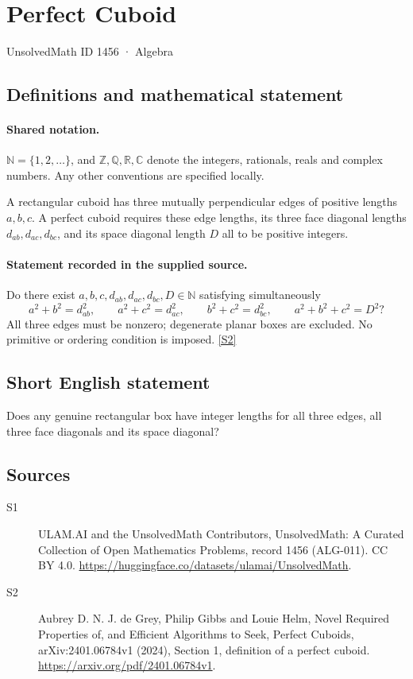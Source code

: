 \documentclass[11pt]{article}
\newcommand{\sref}[2]{\hyperlink{source:#1:#2}{[S#2]}}
\begin{document}
\setcounter{section}{1455}
\section{Perfect Cuboid}\label{1456}
{\small\sffamily UnsolvedMath ID 1456 · Algebra}
\subsection{Definitions and mathematical statement}

\paragraph{Shared notation.}$\mathbb N=\{1,2,\ldots\}$, and $\mathbb Z,\mathbb Q,\mathbb R,\mathbb C$ denote the integers, rationals, reals and complex numbers. Any other conventions are specified locally.


A rectangular cuboid has three mutually perpendicular edges of positive lengths $a,b,c$. A perfect cuboid requires these edge lengths, its three face diagonal lengths $d_{ab},d_{ac},d_{bc}$, and its space diagonal length $D$ all to be positive integers.
\paragraph{Statement recorded in the supplied source.}
Do there exist $a,b,c,d_{ab},d_{ac},d_{bc},D\in\mathbb N$ satisfying simultaneously
\[
 a^2+b^2=d_{ab}^2,\qquad a^2+c^2=d_{ac}^2,\qquad b^2+c^2=d_{bc}^2,
 \qquad a^2+b^2+c^2=D^2?
\]
All three edges must be nonzero; degenerate planar boxes are excluded. No primitive or ordering condition is imposed. \sref{1456}{2}
\subsection{Short English statement}
Does any genuine rectangular box have integer lengths for all three edges, all three face diagonals and its space diagonal?
\subsection{Sources}
\begin{description}
\item[\hypertarget{source:1456:1}{S1}] ULAM.AI and the UnsolvedMath Contributors, UnsolvedMath: A Curated Collection of Open Mathematics Problems, record 1456 (ALG-011). CC BY 4.0. \url{https://huggingface.co/datasets/ulamai/UnsolvedMath}.
\item[\hypertarget{source:1456:2}{S2}] Aubrey D. N. J. de Grey, Philip Gibbs and Louie Helm, Novel Required Properties of, and Efficient Algorithms to Seek, Perfect Cuboids, arXiv:2401.06784v1 (2024), Section 1, definition of a perfect cuboid. \url{https://arxiv.org/pdf/2401.06784v1}.
\end{description}
\label{end:1456}
\end{document}
